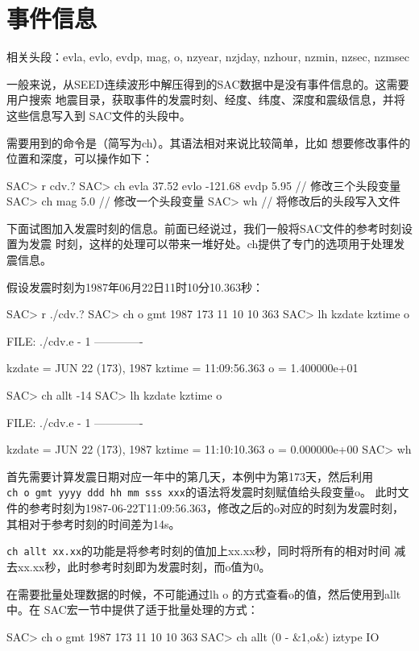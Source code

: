 \section{事件信息}
相关头段：evla, evlo, evdp, mag, o, nzyear, nzjday, nzhour, nzmin, nzsec, nzmsec

一般来说，从SEED连续波形中解压得到的SAC数据中是没有事件信息的。这需要用户搜索
地震目录，获取事件的发震时刻、经度、纬度、深度和震级信息，并将这些信息写入到
SAC文件的头段中。

需要用到的命令是（简写为ch）。其语法相对来说比较简单，比如
想要修改事件的位置和深度，可以操作如下：
\begin{SACCode}
SAC> r cdv.?
SAC> ch evla 37.52 evlo -121.68 evdp 5.95   // 修改三个头段变量
SAC> ch mag 5.0                             // 修改一个头段变量
SAC> wh                                     // 将修改后的头段写入文件
\end{SACCode}

下面试图加入发震时刻的信息。前面已经说过，我们一般将SAC文件的参考时刻设置为发震
时刻，这样的处理可以带来一堆好处。ch提供了专门的选项用于处理发震信息。

假设发震时刻为1987年06月22日11时10分10.363秒：
\begin{SACCode}
SAC> r ./cdv.?
SAC> ch o gmt 1987 173 11 10 10 363
SAC> lh kzdate kztime o
  
  FILE: ./cdv.e - 1
 -------------

     kzdate = JUN 22 (173), 1987
     kztime = 11:09:56.363
          o = 1.400000e+01
  
SAC> ch allt -14
SAC> lh kzdate kztime o
  
  FILE: ./cdv.e - 1
 -------------

     kzdate = JUN 22 (173), 1987
     kztime = 11:10:10.363
          o = 0.000000e+00
SAC> wh
\end{SACCode}

首先需要计算发震日期对应一年中的第几天，本例中为第173天，然后利用\\
\lstinline{ch o gmt yyyy ddd hh mm sss xxx}的语法将发震时刻赋值给头段变量o。
此时文件的参考时刻为1987-06-22T11:09:56.363，修改之后的o对应的时刻为发震时刻，
其相对于参考时刻的时间差为14s。

\lstinline{ch allt xx.xx}的功能是将参考时刻的值加上xx.xx秒，同时将所有的相对时间
减去xx.xx秒，此时参考时刻即为发震时刻，而o值为0。

在需要批量处理数据的时候，不可能通过lh o 的方式查看o的值，然后使用到allt中。在
SAC宏一节中提供了适于批量处理的方式：
\begin{SACCode}
SAC> ch o gmt 1987 173 11 10 10 363 
SAC> ch allt (0 - &1,o&) iztype IO      
\end{SACCode}

